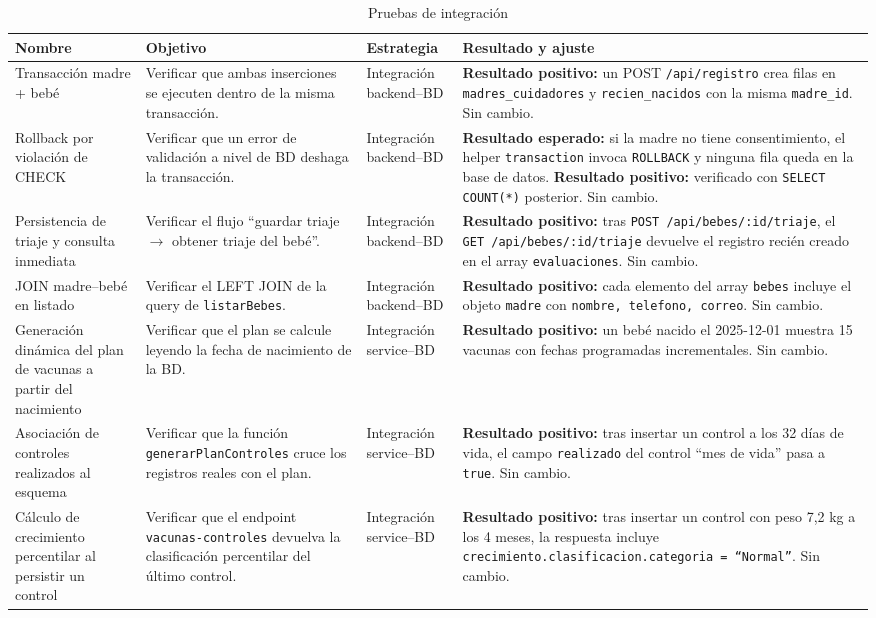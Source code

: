 \documentclass[12pt,letterpaper]{article}
\begin{document}
\begin{longtable}{p{}p{}p{}p{}}
\caption{Pruebas de integración}\\\toprule
\textbf{Nombre} & \textbf{Objetivo} & \textbf{Estrategia} & \textbf{Resultado y ajuste} \\\midrule
\endhead
Transacción madre + bebé & Verificar que ambas inserciones se ejecuten dentro de la misma transacción. & Integración backend--BD & \textbf{Resultado positivo:} un POST \texttt{/api/registro} crea filas en \texttt{madres\_cuidadores} y \texttt{recien\_nacidos} con la misma \texttt{madre\_id}. Sin cambio.\\\hline
Rollback por violación de CHECK & Verificar que un error de validación a nivel de BD deshaga la transacción. & Integración backend--BD & \textbf{Resultado esperado:} si la madre no tiene consentimiento, el helper \texttt{transaction} invoca \texttt{ROLLBACK} y ninguna fila queda en la base de datos. \textbf{Resultado positivo:} verificado con \texttt{SELECT COUNT(*)} posterior. Sin cambio.\\\hline
Persistencia de triaje y consulta inmediata & Verificar el flujo ``guardar triaje $\to$ obtener triaje del bebé''. & Integración backend--BD & \textbf{Resultado positivo:} tras \texttt{POST /api/bebes/:id/triaje}, el \texttt{GET /api/bebes/:id/triaje} devuelve el registro recién creado en el array \texttt{evaluaciones}. Sin cambio.\\\hline
JOIN madre--bebé en listado & Verificar el LEFT JOIN de la query de \texttt{listarBebes}. & Integración backend--BD & \textbf{Resultado positivo:} cada elemento del array \texttt{bebes} incluye el objeto \texttt{madre} con \texttt{nombre, telefono, correo}. Sin cambio.\\\hline
Generación dinámica del plan de vacunas a partir del nacimiento & Verificar que el plan se calcule leyendo la fecha de nacimiento de la BD. & Integración service--BD & \textbf{Resultado positivo:} un bebé nacido el 2025-12-01 muestra 15 vacunas con fechas programadas incrementales. Sin cambio.\\\hline
Asociación de controles realizados al esquema & Verificar que la función \texttt{generarPlanControles} cruce los registros reales con el plan. & Integración service--BD & \textbf{Resultado positivo:} tras insertar un control a los 32 días de vida, el campo \texttt{realizado} del control ``mes de vida'' pasa a \texttt{true}. Sin cambio.\\\hline
Cálculo de crecimiento percentilar al persistir un control & Verificar que el endpoint \texttt{vacunas-controles} devuelva la clasificación percentilar del último control. & Integración service--BD & \textbf{Resultado positivo:} tras insertar un control con peso 7,2 kg a los 4 meses, la respuesta incluye \texttt{crecimiento.clasificacion.categoria = ``Normal''}. Sin cambio.\\\hline

\end{longtable}
\end{document}
